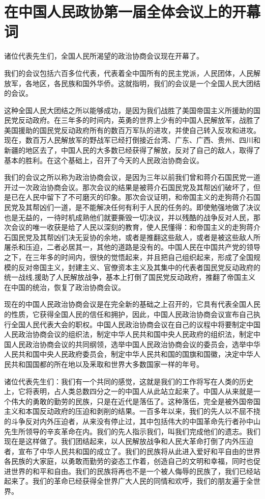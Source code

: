 \section[在中国人民政协第一届全体会议上的开幕词（一九四九年九月二十一日）]{在中国人民政协第一届全体会议上的开幕词}


诸位代表先生们，全国人民所渴望的政治协商会议现在开幕了。

我们的会议包括六百多位代表，代表着全中国所有的民主党派，人民团体，人民解放军，各地区，各民族和国外华侨。这就指明，我们的会议是一个全国人民大团结的会议。

这种全国人民大团结之所以能够成功，是因为我们战胜了美国帝国主义所援助的国民党反动政府。在三年多的时间内，英勇的世界上少有的中国人民解放军，战胜了美国援助的国民党反动政府所有的数百万军队的进攻，并使自己转入反攻和进攻。现在，数百万人民解放军的野战军已经打倒接近台湾、广东、广西、贵州、四川和新疆的地区去了，中国人民的大多数已经获得了解放，反对了自己的敌人，取得了基本的胜利。在这个基础上，召开了今天的人民政治协商会议。

我们的会议之所以称为政治协商会议，是因为三年以前我们曾和蒋介石国民党一道开过一次政治协商会议。那次会议的结果是被蒋介石国民党及其帮凶们破坏了，但是已在人民中留下了不可磨灭的印象。那次会议证明，和帝国主义的走狗蒋介石国民党及其帮凶们一道，是不能解决任何有利于人民的任务的。即使勉强地做了决议也是无益的，一待时机成熟他们就要撕毁一切决议，并以残酷的战争反对人民，那次会议的唯一收获是给了人民以深刻的教育，使人民懂得：和帝国主义的走狗蒋介石国民党及其帮凶们决无妥协的余地，或者是推翻这些敌人，或者是被这些敌人所屠杀和压迫，二者必居其一，其他的道路是没有的。中国人民在中国共产党的领导之下，在三年多的时间内，很快的觉悟起来，并且把自己组织起来，形成了全国规模的反对帝国主义，封建主义、官僚资本主义及其集中的代表者国民党反动政府的统一战线,援助了人民解放战争，基本上打倒了国民党反动政府，推翻了帝国主义在中国的统治，恢复了政治协商会议。

现在的中国人民政治协商会议是在完全新的基础之上召开的，它具有代表全国人民的性质，它获得全国人民的信任和拥护，因此，中国人民政治协商会议宣布自己执行全国人民代表大会的职权。中国人民政治协商会议在自己的议程中将要制定中国人民政治协商会议的组织法，制定中华人民共和国中央人民政府的组织法，制定中国人民政治协商会议的共同纲领，选举中国人民政治协商会议的委员会，选举中华人民共和国中央人民政府委员会，制定中华人民共和国的国旗和国徽，决定中华人民共和国国都的所在地以及釆取和世界大多数国家一样的年号。

诸位代表先生们：我们有一个共同的感觉，这就是我们的工作将写在人类的历史上，它将表明，占人类总数四分之一的中国人从此站立起来了。中国人从来就是一个伟大的勇敢的勤劳的民族，只是在近代是落伍了。这种落伍，完全是被外国帝国主义和本国反动政府的压迫和剥削的结果。一百多年以来，我们的先人以不屈不挠的斗争反对内外压迫者，从来没有停止过，其中包括伟大的中国革命先行者孙中山先生所领导的辛亥革命在内。我们的先人指示我们，叫我们完成他们的遗志。我们现在是这样做了。我们团结起来，以人民解放战争和人民大革命打倒了内外压迫者，宣布了中华人民共和国的成立了。我们的民族将从此进入爱好和平自由的世界各民族的大家庭，以勇敢而勤劳的姿态工作着，创造自己的文明和幸福，同时也促进世界的和平和自由。我们的民族将再也不是一个被人侮辱的民族了，我们已经站起来了。我们的革命已经获得全世界广大人民的同情和欢呼，我们的朋友遍于全世界。

